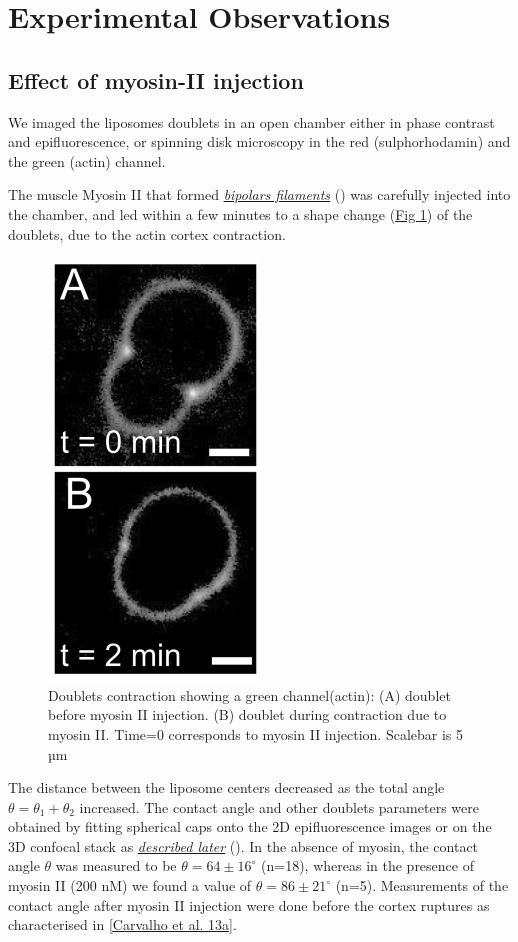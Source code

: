 \documentclass[A4paperpaper,11pt,english]{sphinxmanual}
\begin{document}
\section{Experimental Observations}
\label{index-latex:experimental-observations}

\subsection{Effect of myosin-II injection}
\label{index-latex:effect-of-myosin-ii-injection}
We imaged the liposomes doublets in an open chamber either in phase contrast
and epifluorescence, or spinning disk microscopy in the red (sulphorhodamin)
and the green (actin) channel.

The muscle Myosin II that formed {\hyperref[index-latex:myoii]{\emph{bipolars filaments}}} () was carefully injected into
the chamber, and led within a few minutes to a shape change (\hyperref[index-latex:doublets-contraction]{Fig  \ref*{index-latex:doublets-contraction}})
of the doublets, due to the actin cortex contraction.
\begin{figure}[htbp]
\centering
\capstart

\includegraphics[width=0.300\linewidth]{doublet-contract.png}
\caption{Doublets contraction showing a green channel(actin): (A) doublet before
myosin II injection. (B) doublet during contraction due to myosin II. Time=0 corresponds to myosin II injection.
Scalebar is 5 µm}\label{index-latex:doublets-contraction}\end{figure}

The distance between the liposome centers decreased as the total angle \(\theta
= \theta_1+\theta_2\) increased. The contact angle and other doublets parameters were obtained by fitting spherical caps onto the 2D epifluorescence
images or on the 3D confocal stack as {\hyperref[index-latex:full3dfit]{\emph{described later}}} ().  In the absence of myosin, the
contact angle \(\theta\) was measured to be \(\theta = 64 \pm 16 ^{\circ}\) (n=18), whereas in
the presence of myosin II (200 nM) we found  a value of \(\theta = 86 \pm 21
^{\circ}\) (n=5). Measurements of the contact angle after myosin II injection were done before the cortex
ruptures as characterised in {\hyperref[index-latex:carvalho2013a]{{[}Carvalho et al. 13a{]}}}.
\end{document}
